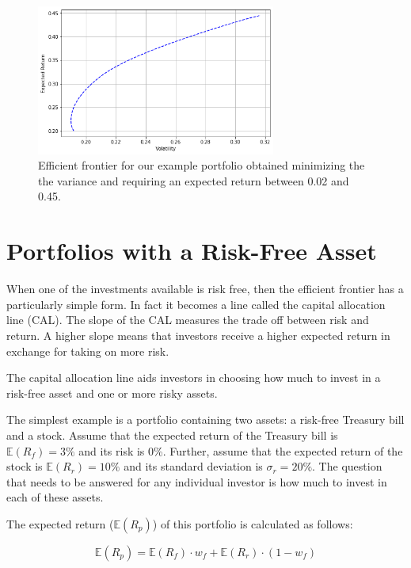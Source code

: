 \begin{figure}[htb]
\centering
\includegraphics[width=0.7\textwidth]{figures/efficient_frontier.png}
\caption{Efficient frontier for our example portfolio obtained minimizing the the variance and requiring an expected return between 0.02 and 0.45.}
\label{fig:efficient_frontier}
\end{figure}
    
\section{Portfolios with a Risk-Free
Asset}\label{portfolios-with-a-risk-free-asset}

When one of the investments available is risk free, then the efficient
frontier has a particularly simple form. In fact it becomes a line called 
the capital allocation line (CAL). The slope of the CAL measures the trade off
between risk and return. A higher slope means that investors receive a
higher expected return in exchange for taking on more risk. %

The capital allocation line aids investors in choosing how much to
invest in a risk-free asset and one or more risky assets.

The simplest example is a portfolio containing two assets: a risk-free
Treasury bill and a stock. Assume that the expected return of the
Treasury bill is \(\mathbb{E}(R_f)=3\%\) and its risk is 0\%. Further, assume that the expected return of the stock is \(\mathbb{E}(R_r)=10\%\) and its standard deviation is \(\sigma_r=20\%\). The question that needs to be answered
for any individual investor is how much to invest in each of these
assets.

The expected return (\(\mathbb{E}(R_p)\)) of this portfolio is calculated as
follows:

\[ \mathbb{E}(R_p) = \mathbb{E}(R_f)\cdot w_f + \mathbb{E}(R_r)\cdot (1- w_f) \]

